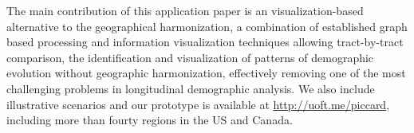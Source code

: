 The main contribution of this application paper is an visualization-based
alternative to the geographical harmonization, a combination of established
graph based processing and information visualization techniques allowing
tract-by-tract comparison, the identification and visualization of patterns of
demographic evolution without geographic harmonization, effectively removing one
of the most challenging problems in longitudinal demographic analysis. We also
include illustrative scenarios and our prototype is available at
\url{http://uoft.me/piccard}, including more than fourty regions in the US and
Canada. 

